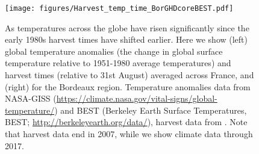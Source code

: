 \documentclass[11pt,letterpaper]{article}
\begin{document}


\newpage




\begin{figure}[t!]
\centering
\texttt{[image: figures/Harvest\_temp\_time\_BorGHDcoreBEST.pdf]}
\caption{As temperatures across the globe have risen significantly since the early 1980s harvest times have shifted earlier. Here we show (left) global temperature anomalies (the change in global surface temperature relative to 1951-1980 average temperatures) and harvest times (relative to 31st August) averaged across France, and (right) for the Bordeaux region. Temperature anomalies data from NASA-GISS (\url{https://climate.nasa.gov/vital-signs/global-temperature/}) and BEST (Berkeley Earth Surface Temperatures, BEST; \url{http://berkeleyearth.org/data/}), harvest data from \citet{daux2012,cookwine2016}. Note that harvest data end in 2007, while we show climate data through 2017.}
  \label{fig:timeseries}
\end{figure}
\clearpage
\end{document}
